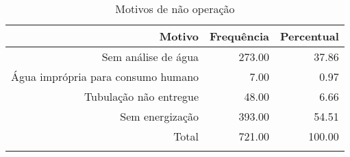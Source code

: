 \documentclass[a4paper, 12pt, openright, oneside, english, brazil, article]{abntex2}
\begin{document}
	
	
	\begin{scriptsize}
		\begin{longtable}{rrr}
			\caption{Motivos de não operação} \\ 
			\hline
			Motivo & Frequência & Percentual \\ 
			\hline
			Sem análise de água & 273.00 & 37.86 \\ 
			Água imprópria para consumo humano & 7.00 & 0.97 \\ 
			Tubulação não entregue & 48.00 & 6.66 \\ 
			Sem energização & 393.00 & 54.51 \\ 
			\hline
			Total & 721.00 & 100.00 \\ 
			\hline
			\hline
			\label{mot-nao-operacao}
		\end{longtable}
	\end{scriptsize}
	
	
	
\end{document}

